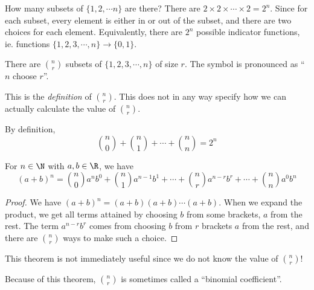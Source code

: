 \documentclass[a4paper]{article}
\begin{document}
\begin{eg}
  How many subsets of $\{1, 2, \cdots n\}$ are there? There are $2\times 2\times \cdots \times 2 = 2^n$. Since for each subset, every element is either in or out of the subset, and there are two choices for each element. Equivalently, there are $2^n$ possible indicator functions, ie. functions $\{1, 2, 3, \cdots, n\} \to \{0, 1\}$.
\end{eg}

\begin{defi}
  There are $\binom{n}{r}$ subsets of $\{1, 2, 3, \cdots, n\}$ of size $r$. The symbol is pronounced as ``$n$ choose $r$''.
\end{defi}
This is the \emph{definition} of $\binom{n}{r}$. This does not in any way specify how we can actually calculate the value of $\binom{n}{r}$.

\begin{prop}
  By definition,
  \[
    \binom{n}{0} + \binom{n}{1} + \cdots + \binom{n}{n} = 2^n
  \]
\end{prop}

\begin{thm}
  For $n\in \N$ with $a, b\in \R$, we have
  \[
    (a + b)^n = \binom{n}{0}a^n b^0 + \binom{n}{1}a^{n-1}b^1 + \cdots + \binom{n}{r}a^{n - r}b^r + \cdots + \binom{n}{n}a^0b^n
  \]
\end{thm}

\begin{proof}
  We have $(a + b)^n = (a + b)(a + b)\cdots (a + b)$. When we expand the product, we get all terms attained by choosing $b$ from some brackets, $a$ from the rest. The term $a^{n - r}b^r$ comes from choosing $b$ from $r$ brackets $a$ from the rest, and there are $\binom{n}{r}$ ways to make such a choice.
\end{proof}
This theorem is not immediately useful since we do not know the value of $\binom{n }{r}$!

Because of this theorem, $\binom{n }{r}$ is sometimes called a ``binomial coefficient''.
\end{document}
